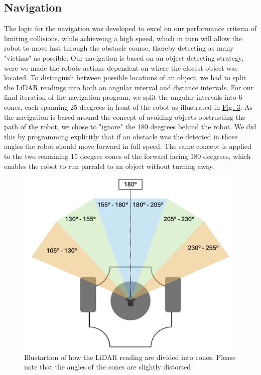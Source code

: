 \documentclass[conference]{IEEEtran}
\begin{document}
\subsection{Navigation}
The logic for the navigation was developed to excel on our performance criteria of limiting collisions, while achieveing a high speed, which in turn will allow the robot to move fast through the obstacle course, thereby detecting as many "victims" as possible.
Our navigation is based on an object detecting strategy, were we made the robots actions dependent on where the closest object was located.
To distinguish between possible locations of an object, we had to split the LiDAR readings into both an angular interval and distance intervals.
For our final iteration of the navigation program, we split the angular intervals into 6 cones, each spanning 25 deegrees in front of the robot as illustrated in \href{sec:angles}{Fig. 3}. 
As the navigation is based around the concept of avoiding objects obstructing the path of the robot, we chose to "ignore" the 180 deegrees behind the robot. 
We did this by programming explicitly that if an obstacle was the detected in those angles the robot should move forward in full speed.
The same concept is applied to the two remaining 15 deegree cones of the forward facing 180 deegrees, which enables the robot to run parralel to an object without turning away.
\begin{figure}[htbp]
    \centerline{\includegraphics[width=1.0\columnwidth]{Pictures/LiDAR Angels.png}}
    \caption{Illustartion of how the LiDAR reading are divided into cones.
    Please note that the angles of the cones are slightly distorted}
    \label{sec:angles}
    \end{figure}
\end{document}
